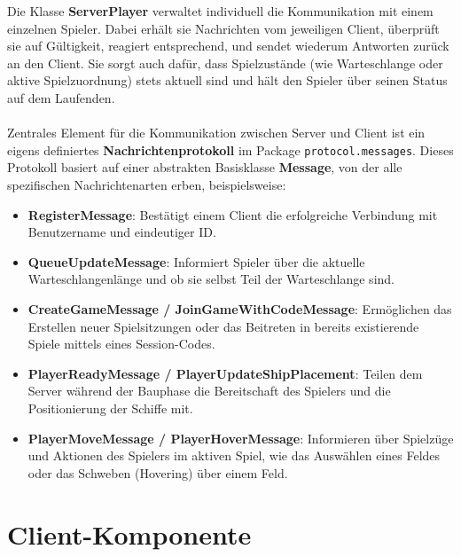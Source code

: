 \documentclass[12pt]{article}
\begin{document}
Die Klasse \textbf{ServerPlayer} verwaltet individuell die Kommunikation mit einem einzelnen Spieler. Dabei erhält sie Nachrichten vom jeweiligen Client, überprüft sie auf Gültigkeit, reagiert entsprechend, und sendet wiederum Antworten zurück an den Client. Sie sorgt auch dafür, dass Spielzustände (wie Warteschlange oder aktive Spielzuordnung) stets aktuell sind und hält den Spieler über seinen Status auf dem Laufenden.
\\ \\
Zentrales Element für die Kommunikation zwischen Server und Client ist ein eigens definiertes \textbf{Nachrichtenprotokoll} im Package \texttt{protocol.messages}. Dieses Protokoll basiert auf einer abstrakten Basisklasse \textbf{Message}, von der alle spezifischen Nachrichtenarten erben, beispielsweise:
\begin{itemize}
    \item \textbf{RegisterMessage}: Bestätigt einem Client die erfolgreiche Verbindung mit Benutzername und eindeutiger ID.
    \item \textbf{QueueUpdateMessage}: Informiert Spieler über die aktuelle Warteschlangenlänge und ob sie selbst Teil der Warteschlange sind.
    \item \textbf{CreateGameMessage / JoinGameWithCodeMessage}: Ermöglichen das Erstellen neuer Spielsitzungen oder das Beitreten in bereits existierende Spiele mittels eines Session-Codes.
    \item \textbf{PlayerReadyMessage / PlayerUpdateShipPlacement}: Teilen dem Server während der Bauphase die Bereitschaft des Spielers und die Positionierung der Schiffe mit.
    \item \textbf{PlayerMoveMessage / PlayerHoverMessage}: Informieren über Spielzüge und Aktionen des Spielers im aktiven Spiel, wie das Auswählen eines Feldes oder das Schweben (Hovering) über einem Feld.
\end{itemize}

\section*{Client-Komponente}
\end{document}
